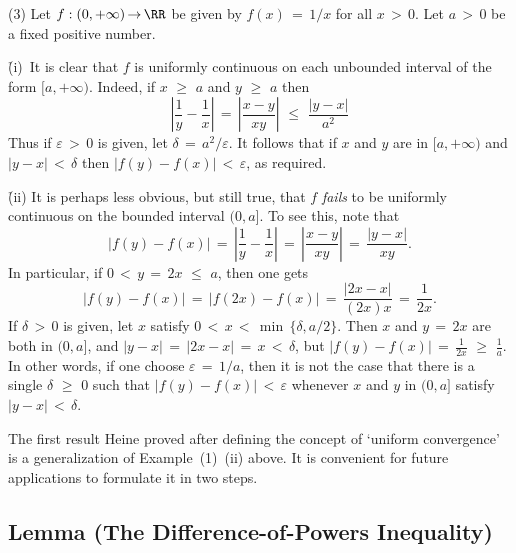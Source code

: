 {\V
%
        (3) Let $f:(0,+{\infty}) \,{\rightarrow}\, {\RR}$ be given by $f(x) \,=\, 1/x$ for all $x\,>\,0$. Let $a\,>\,0$ be a fixed positive number.

        \h (i)\, It is clear that $f$ is uniformly continuous on each unbounded interval of the form $[a,+{\infty})$.
    Indeed, if $x\,\,{\geq}\,\,a$ and $y\,\,{\geq}\,\,a$ then
        \begin{displaymath}
        \left|\frac{1}{y} - \frac{1}{x}\right| \,=\, \left|\frac{x-y}{xy}\right|\,\,{\leq}\,\,\frac{|y-x|}{a^{2}}
        \end{displaymath}
    Thus if ${\varepsilon}\,>\,0$ is given, let ${\delta} \,=\, a^{2}/{\varepsilon}$. It follows that if $x$ and $y$ are in $[a,+{\infty})$ and $|y-x|\,<\,{\delta}$ then $|f(y) - f(x)|\,<\,{\varepsilon}$, as required.

        \h (ii) It is perhaps less obvious, but still true, that $f$ {\em fails} to be uniformly continuous on the bounded interval $(0,a]$.
    To see this, note that
        \begin{displaymath}
        |f(y)-f(x)| \,=\, \left|\frac{1}{y} - \frac{1}{x}\right| \,=\, \left|\frac{x-y}{xy}\right| \,=\, \frac{|y-x|}{xy}.
        \end{displaymath}
    In particular, if $0\,<\,y \,=\, 2x\,\,{\leq}\,\,a$, then one gets
        \begin{displaymath}
        |f(y) - f(x)| \,=\, |f(2x) - f(x)| \,=\, \frac{|2x-x|}{(2x)x} \,=\, \frac{1}{2x}.
        \end{displaymath}
    If ${\delta}\,>\,0$ is given, let $x$ satisfy $0\,<\,x\,<\,{\min}\,\{{\delta}, a/2\}$.
    Then $x$ and $y \,=\, 2x$ are both in $(0,a]$, and $|y-x| \,=\, |2x-x| \,=\, x\,<\,{\delta}$,
    but ${\displaystyle |f(y)-f(x)| \,=\, \frac{1}{2x}\,\,{\geq}\,\,\frac{1}{a}}$.
    In other words, if one choose ${\varepsilon} \,=\, 1/a$, then it is not the case that there is a single ${\delta}\,\,{\geq}\,\,0$ such that $|f(y)-f(x)|\,<\,{\varepsilon}$ whenever $x$ and $y$ in $(0,a]$ satisfy $|y-x|\,<\,{\delta}$.


\V
\V

        The first result Heine proved after defining the concept of `uniform convergence' is a generalization of Example~(1)~(ii) above.
    It is convenient for future applications to formulate it in two steps.

\V

            \subsection{\small{\bf Lemma} (The Difference-of-Powers Inequality)}
            \label{LemmaD60.35A}

}
